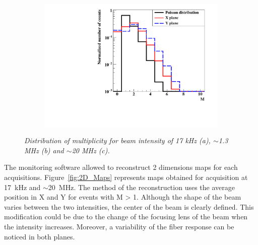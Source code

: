 \documentclass[a4paper,11pt]{article}
\begin{document}
\begin{figure}[H]
\begin{subfigure}{0.3\textwidth}
    \end{subfigure}
    ~
    \begin{subfigure}{0.3\textwidth} \centering \includegraphics[width=\textwidth]{figures/Involved_fibers_20MHz_without_X=0.pdf} \caption{} \label{fig:Fibers_20MHz}
    \end{subfigure}
\caption{\small{\textit{Distribution of multiplicity for beam intensity of 17 kHz (a), $\sim$1.3 MHz (b) and $\sim$20 MHz (c).}}}
\label{fig:Multiplicity}
\end{figure}

The monitoring software allowed to reconstruct 2 dimensions maps for each acquisitions. Figure~\ref{fig:2D_Maps} represents maps obtained for acquisition at 17~kHz and $\sim$20~MHz. The method of the reconstruction uses the  average position in X and Y for events with M > 1. Although the shape of the beam varies between the two intensities, the center of the beam is clearly defined. This modification could be due to the change of the focusing lens of the beam when the intensity increases. Moreover, a variability of the fiber response can be noticed in both planes.
\end{document}
